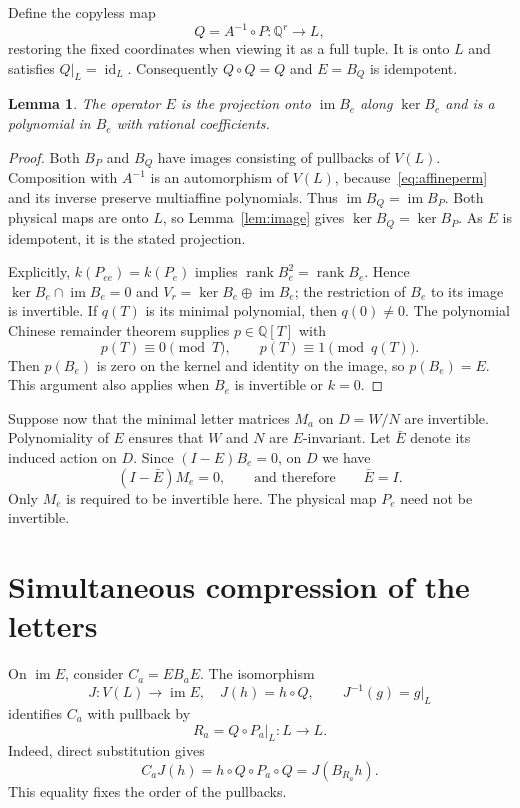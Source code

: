 \documentclass[acmlarge,screen,11pt,nonacm]{acmart}
\newcommand{\Q}{\mathbb{Q}}
\newcommand{\im}{\operatorname{im}}
\newcommand{\id}{\operatorname{id}}
\newtheorem{lemma}[theorem]{Lemma}
\theoremstyle{definition}
\begin{document}
Define the copyless map
\[
 Q=A^{-1}\circ P:\Q^r\longrightarrow L,
\]
restoring the fixed coordinates when viewing it as a full tuple. It is onto $L$ and satisfies $Q|_L=\id_L$. Consequently $Q\circ Q=Q$ and $E=B_Q$ is idempotent.

\begin{lemma}\label{lem:projection}
The operator $E$ is the projection onto $\im B_e$ along $\ker B_e$ and is a polynomial in $B_e$ with rational coefficients.
\end{lemma}
\begin{proof}
Both $B_P$ and $B_Q$ have images consisting of pullbacks of $V(L)$. Composition with $A^{-1}$ is an automorphism of $V(L)$, because~\eqref{eq:affineperm} and its inverse preserve multiaffine polynomials. Thus $\im B_Q=\im B_P$. Both physical maps are onto $L$, so Lemma~\ref{lem:image} gives $\ker B_Q=\ker B_P$. As $E$ is idempotent, it is the stated projection.

Explicitly, $k(P_{ee})=k(P_e)$ implies $\operatorname{rank}B_e^2=\operatorname{rank}B_e$. Hence $\ker B_e\cap\im B_e=0$ and $V_r=\ker B_e\oplus\im B_e$; the restriction of $B_e$ to its image is invertible. If $q(T)$ is its minimal polynomial, then $q(0)\ne0$. The polynomial Chinese remainder theorem supplies $p\in\Q[T]$ with
\[
 p(T)\equiv0\pmod T,\qquad p(T)\equiv1\pmod{q(T)}.
\]
Then $p(B_e)$ is zero on the kernel and identity on the image, so $p(B_e)=E$. This argument also applies when $B_e$ is invertible or $k=0$.
\end{proof}

Suppose now that the minimal letter matrices $M_a$ on $D=W/N$ are invertible. Polynomiality of $E$ ensures that $W$ and $N$ are $E$-invariant. Let $\bar E$ denote its induced action on $D$. Since $(I-E)B_e=0$, on $D$ we have
\begin{equation}\label{eq:identityquotient}
 (I-\bar E)M_e=0,\qquad\text{and therefore}\qquad\bar E=I.
\end{equation}
Only $M_e$ is required to be invertible here. The physical map $P_e$ need not be invertible.

\section{Simultaneous compression of the letters}\label{sec:compression}
On $\im E$, consider $C_a=EB_aE$. The isomorphism
\[
 J:V(L)\longrightarrow\im E,\quad J(h)=h\circ Q,
 \qquad J^{-1}(g)=g|_L
\]
identifies $C_a$ with pullback by
\begin{equation}\label{eq:Ra}
 R_a=Q\circ P_a|_L:L\longrightarrow L.
\end{equation}
Indeed, direct substitution gives
\[
 C_aJ(h)=h\circ Q\circ P_a\circ Q=J(B_{R_a}h).
\]
This equality fixes the order of the pullbacks.
\end{document}
